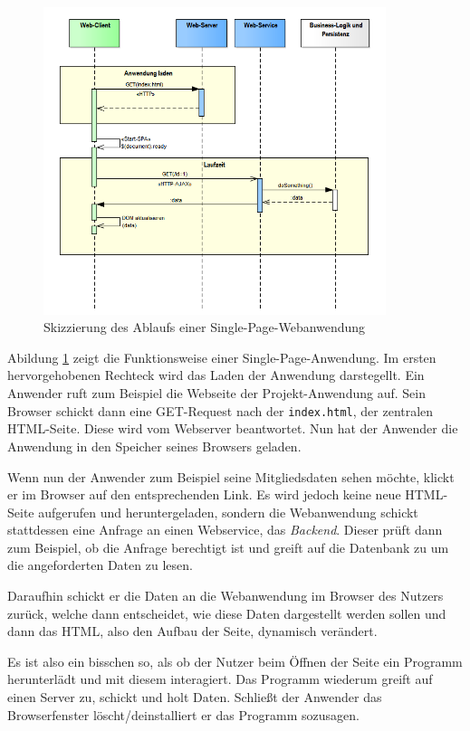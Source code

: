 \documentclass[a4paper, 11pt]{article}
\begin{document}
\begin{figure}[htpb]
    \centering
    \includegraphics[width=10cm]{images/SPA_Start.png}
    \caption{Skizzierung des Ablaufs einer Single-Page-Webanwendung}
    \label{fig:spa_start}
\end{figure}

Abildung \ref{fig:spa_start} zeigt die Funktionsweise einer
Single-Page-Anwendung. Im ersten hervorgehobenen Rechteck wird das Laden der
Anwendung darstegellt. Ein Anwender ruft zum Beispiel die Webseite der
Projekt-Anwendung auf. Sein Browser schickt dann eine GET-Request nach der
\texttt{index.html}, der zentralen HTML-Seite. Diese wird vom Webserver
beantwortet. Nun hat der Anwender die Anwendung in den Speicher seines Browsers
geladen. 

Wenn nun der Anwender zum Beispiel seine Mitgliedsdaten sehen möchte, klickt er
im Browser auf den entsprechenden Link. Es wird jedoch keine neue HTML-Seite
aufgerufen und heruntergeladen, sondern die Webanwendung schickt stattdessen
eine Anfrage an einen Webservice, das \emph{Backend}. Dieser prüft dann zum
Beispiel, ob die Anfrage berechtigt ist und greift auf die Datenbank zu um die
angeforderten Daten zu lesen.

Daraufhin schickt er die Daten an die Webanwendung im Browser des Nutzers
zurück, welche dann entscheidet, wie diese Daten dargestellt werden sollen und
dann das HTML, also den Aufbau der Seite, dynamisch verändert.

Es ist also ein bisschen so, als ob der Nutzer beim Öffnen der Seite ein
Programm herunterlädt und mit diesem interagiert. Das Programm wiederum greift
auf einen Server zu, schickt und holt Daten. Schließt der Anwender das
Browserfenster löscht/deinstalliert er das Programm sozusagen.
\end{document}
